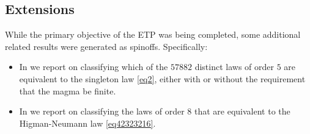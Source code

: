 \subsection{Extensions}

While the primary objective of the ETP was being completed, some additional related results were generated as spinoffs.  Specifically:
\begin{itemize}
\item In  we report on classifying which of the $57882$ distinct laws of order $5$ are equivalent to the singleton law \eqref{eq2}, either with or without the requirement that the magma be finite.
\item In  we report on classifying the laws of order $8$ that are equivalent to the Higman-Neumann law \eqref{eq42323216}.
\end{itemize}


